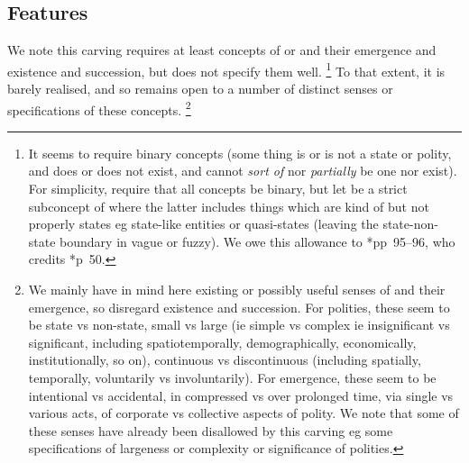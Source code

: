 	\subsection{Features}
	\label{ss:features}
		We note this carving requires at least concepts of  or  and their emergence and existence and succession, but does not specify them well.%
		\footnote{It seems to require binary concepts (some thing is or is not a state or polity, and does or does not exist, and cannot \emph{sort of} nor \emph{partially} be one nor exist). For simplicity, require that all concepts be binary, but let  be a strict subconcept of  where the latter includes things which are kind of but not properly states eg state-like entities or quasi-states (leaving the state-non-state boundary in  vague or fuzzy). We owe this allowance to \cite{cam11}*{pp~95--96}, who credits \cite{luk50}*{p~50}.}
		To that extent, it is barely realised, and so remains open to a number of distinct senses or specifications of these concepts.%
		\footnote{We mainly have in mind here existing or possibly useful senses of  and their emergence, so disregard existence and succession. For polities, these seem to be state vs non-state, small vs large (ie simple vs complex ie insignificant vs significant, including spatiotemporally, demographically, economically, institutionally, so on), continuous vs discontinuous (including spatially, temporally, voluntarily vs involuntarily). For emergence, these seem to be intentional vs accidental, in compressed vs over prolonged time, via single vs various acts, of corporate vs collective aspects of polity. We note that some of these senses have already been disallowed by this carving eg some specifications of largeness or complexity or significance of polities.} %
	
